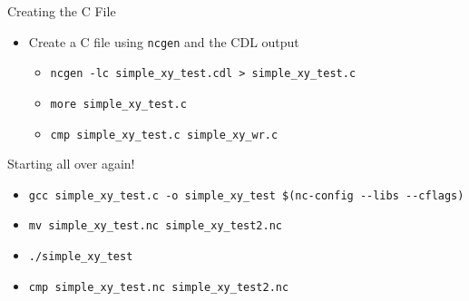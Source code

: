 \documentclass[compress,11pt,xcolor=svgnames,aspectratio=169]{beamer}
\begin{document}
\begin{frame}[fragile]{Creating the C File}

\begin{itemize}
\setlength\itemsep{0.5cm}

  \item Create a C file using \texttt{ncgen} and the CDL output

    \begin{itemize}

      \item \verb|ncgen -lc simple_xy_test.cdl > simple_xy_test.c|
      \item \verb|more simple_xy_test.c|
      \item \verb|cmp simple_xy_test.c simple_xy_wr.c|

    \end{itemize}

\end{itemize}

\end{frame}

\begin{frame}[fragile]{Starting all over again!}

\begin{itemize}

  \item \verb|gcc simple_xy_test.c -o simple_xy_test $(nc-config --libs --cflags)|
  \item \verb|mv simple_xy_test.nc simple_xy_test2.nc|
  \item \verb|./simple_xy_test|
  \item \verb|cmp simple_xy_test.nc simple_xy_test2.nc|

\end{itemize}

\end{frame}
\end{document}
